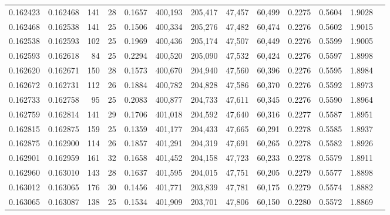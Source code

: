 \begin{tabular}{rrrrrrrrrrrrr}
0.162423 & 0.162468 & 141 &  28 &                                     0.1657 & 400,193 & 205,417 &  47,457 &  60,499 & 0.2275 & 0.5604 & 1.9028 \\
0.162468 & 0.162538 & 141 &  25 &                                     0.1506 & 400,334 & 205,276 &  47,482 &  60,474 & 0.2276 & 0.5602 & 1.9015 \\
0.162538 & 0.162593 & 102 &  25 &                                     0.1969 & 400,436 & 205,174 &  47,507 &  60,449 & 0.2276 & 0.5599 & 1.9005 \\
0.162593 & 0.162618 &  84 &  25 &                                     0.2294 & 400,520 & 205,090 &  47,532 &  60,424 & 0.2276 & 0.5597 & 1.8998 \\
0.162620 & 0.162671 & 150 &  28 &                                     0.1573 & 400,670 & 204,940 &  47,560 &  60,396 & 0.2276 & 0.5595 & 1.8984 \\
0.162672 & 0.162731 & 112 &  26 &                                     0.1884 & 400,782 & 204,828 &  47,586 &  60,370 & 0.2276 & 0.5592 & 1.8973 \\
0.162733 & 0.162758 &  95 &  25 &                                     0.2083 & 400,877 & 204,733 &  47,611 &  60,345 & 0.2276 & 0.5590 & 1.8964 \\
0.162759 & 0.162814 & 141 &  29 &                                     0.1706 & 401,018 & 204,592 &  47,640 &  60,316 & 0.2277 & 0.5587 & 1.8951 \\
0.162815 & 0.162875 & 159 &  25 &                                     0.1359 & 401,177 & 204,433 &  47,665 &  60,291 & 0.2278 & 0.5585 & 1.8937 \\
0.162875 & 0.162900 & 114 &  26 &                                     0.1857 & 401,291 & 204,319 &  47,691 &  60,265 & 0.2278 & 0.5582 & 1.8926 \\
0.162901 & 0.162959 & 161 &  32 &                                     0.1658 & 401,452 & 204,158 &  47,723 &  60,233 & 0.2278 & 0.5579 & 1.8911 \\
0.162960 & 0.163010 & 143 &  28 &                                     0.1637 & 401,595 & 204,015 &  47,751 &  60,205 & 0.2279 & 0.5577 & 1.8898 \\
0.163012 & 0.163065 & 176 &  30 &                                     0.1456 & 401,771 & 203,839 &  47,781 &  60,175 & 0.2279 & 0.5574 & 1.8882 \\
0.163065 & 0.163087 & 138 &  25 &                                     0.1534 & 401,909 & 203,701 &  47,806 &  60,150 & 0.2280 & 0.5572 & 1.8869 \\

\end{tabular}
